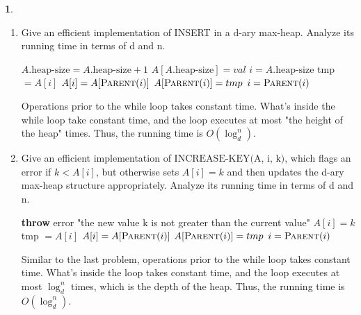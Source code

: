 \documentclass[11pt]{article}
\theoremstyle{definition}
\theoremstyle{theorem}
\newtheorem{prob}{}
\newcommand{\solution}{\medskip\noindent{\color{DarkBlue}\textbf{Solution:}}}
\begin{document}
\begin{prob}
\begin{enumerate}
\newpage
\item Give an efficient implementation of INSERT in a d-ary max-heap. Analyze its running time in terms of d and n.

\solution

\begin{algorithmic}[1]
	\State $A.\text{heap-size} = A.\text{heap-size} + 1$ 
	\State $A[A.\text{heap-size}] = val$
	\State $i = A.\text{heap-size}$
	 
		\State tmp $= A[i]$
		\State $A[i] = A[\textproc{\textsc{Parent}}(i)]$
		\State $A[\textproc{\textsc{Parent}}(i)] = tmp$ 
		\State $i = \textproc{\textsc{Parent}}(i)$
	\EndWhile
\EndFunction
\end{algorithmic}
Operations prior to the while loop takes constant time. What's inside the while loop take constant time, and the loop executes at most "the height of the heap" times. Thus, the running time is $O(\log_d^n)$.

\item Give an efficient implementation of $\text{INCREASE-KEY(A, i, k)}$, which flags an error if $k < A[i]$, but otherwise sets $A[i] = k$ and then updates the d-ary max-heap structure appropriately. Analyze its running time in terms of d and n.

\solution

\begin{algorithmic}[1]
		\State \textbf{throw} error "the new value k is not greater than the current value"
	\EndIf
	\State $A[i] = k$
		\State tmp $= A[i]$
		\State $A[i] = A[\textproc{\textsc{Parent}}(i)]$
		\State $A[\textproc{\textsc{Parent}}(i)] = tmp$ 
		\State $i = \textproc{\textsc{Parent}}(i)$
	\EndWhile
\EndFunction
\end{algorithmic}
Similar to the last problem, operations prior to the while loop takes constant time. What's inside the loop takes constant time, and the loop executes at most $\log_d^n$ times, which is the depth of the heap. Thus, the running time is $O(\log_d^n)$.

\end{enumerate}
\end{prob}
\end{document}
